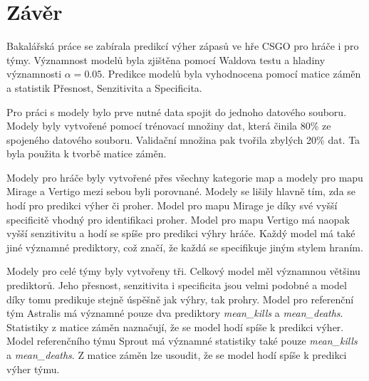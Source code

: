 \chapter*{Závěr}
Bakalářská práce se zabírala predikcí výher zápasů ve hře \ac{CSGO} pro hráče i pro týmy. Významnost modelů byla zjištěna pomocí Waldova testu a hladiny významnosti
$\alpha = 0.05$. Predikce modelů byla vyhodnocena pomocí matice záměn a statistik Přesnost, Senzitivita a Specificita.

Pro práci s modely bylo prve nutné data spojit do jednoho datového souboru. Modely byly vytvořené pomocí trénovací množiny dat, která činila 80\% ze 
spojeného datového souboru. Validační množina pak tvořila zbylých 20\% dat. Ta byla použita k tvorbě matice záměn.

Modely pro hráče byly vytvořené přes všechny kategorie map a modely pro mapu Mirage a Vertigo mezi sebou byli porovnané. Modely se lišily hlavně tím, zda se hodí pro 
predikci výher či proher. Model pro mapu Mirage je díky své vyšší specificitě vhodný pro identifikaci proher. Model pro mapu Vertigo má naopak vyšší senzitivitu
a hodí se spíše pro predikci výhry hráče. Každý model má také jiné významné prediktory, což značí, že každá se specifikuje jiným stylem hraním.

Modely pro celé týmy byly vytvořeny tři. Celkový model měl významnou většinu prediktorů. Jeho přesnost, senzitivita i specificita jsou velmi podobné a model díky tomu
predikuje stejně úspěšně jak výhry, tak prohry. Model pro referenční tým Astralis má významné pouze dva prediktory \textit{mean\_kills} a \textit{mean\_deaths}. Statistiky
z matice záměn naznačují, že se model hodí spíše k predikci výher. Model referenčního týmu Sprout má významné statistiky také pouze \textit{mean\_kills} a \textit{mean\_deaths}.
Z matice záměn lze usoudit, že se model hodí spíše k predikci výher týmu.